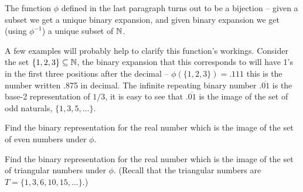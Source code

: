 The function $\phi$ defined in the last paragraph turns out to be a 
bijection -- given a subset we get a unique binary expansion, and given 
binary expansion we get (using $\phi^{-1}$) a unique subset  of 
${\mathbb N}$.

A few examples will
probably help to clarify this function's workings.  Consider 
the set $\{1,2,3\} \subseteq {\mathbb N}$, the binary expansion that this
corresponds to will have 1's in the first three positions after the 
decimal -- $\phi(\{1,2,3\}) = .111$ this is the number written .875
in decimal.  The infinite repeating binary number $.\overline{01}$ 
is the base-2 representation of $1/3$, it is easy to see that
$.\overline{01}$ is the image of the set of odd naturals, $\{1,3,5,\ldots\}$.

\begin{exer}
Find the binary representation for the real number which is the image of
the set of even numbers under $\phi$.  
\end{exer}

\begin{exer}
Find the binary representation for the real number which is the image of
the set of triangular numbers under $\phi$.  (Recall that the triangular
numbers are $T = \{1,3,6,10,15, \ldots \}$.)
\end{exer}

\newpage




